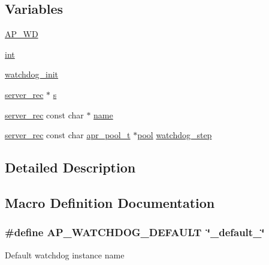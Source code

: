 \subsection*{Variables}
\begin{DoxyCompactItemize}
\item 
\hyperlink{group__MOD__WATCHDOG_gaf0efa033f8b3edba0596755536f8aeb7}{A\+P\+\_\+\+WD}
\item 
\hyperlink{group__MOD__WATCHDOG_gaf0b5a943e734de7ea24142e2c81d82ef}{int}
\item 
\hyperlink{group__MOD__WATCHDOG_gaf233baa79c0d5c932fb358370d1b868d}{watchdog\+\_\+init}
\item 
\hyperlink{structserver__rec}{server\+\_\+rec} $\ast$ \hyperlink{group__MOD__WATCHDOG_ga6568b7b78d229d4c11b915b0570901c1}{s}
\item 
\hyperlink{structserver__rec}{server\+\_\+rec} const char $\ast$ \hyperlink{group__MOD__WATCHDOG_ga5df88c26ff207fd6030c2a049ed4dae9}{name}
\item 
\hyperlink{structserver__rec}{server\+\_\+rec} const char \hyperlink{structapr__pool__t}{apr\+\_\+pool\+\_\+t} $\ast$\hyperlink{group__APR__XLATE_gabb3cd978f04c73d0b763c391e9bfde73}{pool} \hyperlink{group__MOD__WATCHDOG_gaaf25ef7424503ef501b0b1efa72f4fb5}{watchdog\+\_\+step}
\end{DoxyCompactItemize}


\subsection{Detailed Description}


\subsection{Macro Definition Documentation}
\subsubsection[{\texorpdfstring{A\+P\+\_\+\+W\+A\+T\+C\+H\+D\+O\+G\+\_\+\+D\+E\+F\+A\+U\+LT}{AP_WATCHDOG_DEFAULT}}]{\setlength{\rightskip}{0pt plus 5cm}\#define A\+P\+\_\+\+W\+A\+T\+C\+H\+D\+O\+G\+\_\+\+D\+E\+F\+A\+U\+LT~\char`\"{}\+\_\+default\+\_\+\char`\"{}}\hypertarget{group__MOD__WATCHDOG_ga9593bcb81a9d908014e6ace95134f9ba}{}\label{group__MOD__WATCHDOG_ga9593bcb81a9d908014e6ace95134f9ba}
Default watchdog instance name 
